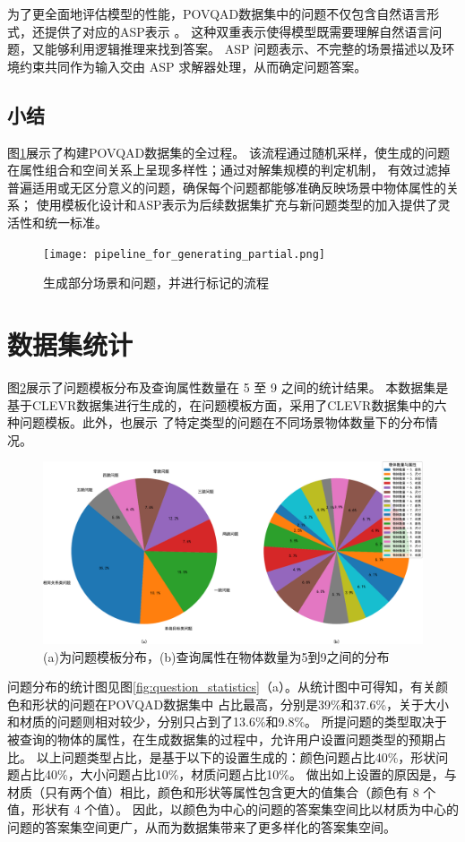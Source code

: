 为了更全面地评估模型的性能，POVQAD数据集中的问题不仅包含自然语言形式，还提供了对应的ASP表示 。
这种双重表示使得模型既需要理解自然语言问题，又能够利用逻辑推理来找到答案。
ASP 问题表示、不完整的场景描述以及环境约束共同作为输入交由 ASP 求解器处理，从而确定问题答案。
\subsection{小结}
图\ref{pipeline_for_generating_partial}展示了构建POVQAD数据集的全过程。
该流程通过随机采样，使生成的问题在属性组合和空间关系上呈现多样性；通过对解集规模的判定机制，
有效过滤掉普遍适用或无区分意义的问题，确保每个问题都能够准确反映场景中物体属性的关系；
使用模板化设计和ASP表示为后续数据集扩充与新问题类型的加入提供了灵活性和统一标准。
\begin{figure}[h]
    \centering
    \texttt{[image: pipeline\_for\_generating\_partial.png]}
    \caption{生成部分场景和问题，并进行标记的流程}
    \label{pipeline_for_generating_partial}
\end{figure}
\section{数据集统计}
图\ref{fig:template_statistics}展示了问题模板分布及查询属性数量在 5 至 9 之间的统计结果。
本数据集是基于CLEVR数据集进行生成的，在问题模板方面，采用了CLEVR数据集中的六种问题模板。此外，也展示
了特定类型的问题在不同场景物体数量下的分布情况。
\begin{figure}[h]
    \centering
    \includegraphics[scale=0.45]{figures/question_template_distribution-crop.pdf}
    \caption{(a)为问题模板分布，(b)查询属性在物体数量为5到9之间的分布}
    \label{fig:template_statistics}
\end{figure}

问题分布的统计图见图\ref{fig:question_statistics}（a）。从统计图中可得知，有关颜色和形状的问题在POVQAD数据集中
占比最高，分别是39\%和37.6\%，关于大小和材质的问题则相对较少，分别只占到了13.6\%和9.8\%。
所提问题的类型取决于被查询的物体的属性，在生成数据集的过程中，允许用户设置问题类型的预期占比。
以上问题类型占比，是基于以下的设置生成的：颜色问题占比40\%，形状问题占比40\%，大小问题占比10\%，材质问题占比10\%。
做出如上设置的原因是，与材质（只有两个值）相比，颜色和形状等属性包含更大的值集合（颜色有 8 个值，形状有 4 个值）。
因此，以颜色为中心的问题的答案集空间比以材质为中心的问题的答案集空间更广，从而为数据集带来了更多样化的答案集空间。

